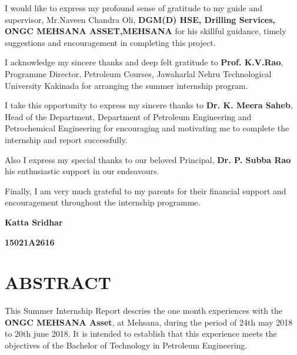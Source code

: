 \documentclass[113pt,a4paper]{report}
\begin{document}
I would like to express my profound sense of gratitude to my guide and supervisor, Mr.Naveen Chandra Oli, \textbf{DGM(D) HSE, Drilling Services, ONGC MEHSANA ASSET,MEHSANA} for his skillful guidance, timely suggestions and encouragement in completing this project.

\vspace{1em}


I acknowledge my sincere thanks and deep felt gratitude to \textbf{Prof. K.V.Rao}, Programme Director, Petroleum Courses, Jawaharlal Nehru Technological University Kakinada for arranging the summer internship program.

\vspace{1em}

I take this opportunity to express my sincere thanks to \textbf{Dr. K. Meera Saheb}, Head of the Department, Department of Petroleum Engineering and Petrochemical Engineering for encouraging and motivating me to complete the internship and report successfully.

\vspace{1em}

Also I express my special thanks to our beloved Principal, \textbf{Dr. P. Subba Rao} his enthusiastic support in our endeavours.

\vspace{1em}

Finally, I am very much grateful to my parents for their financial support and encouragement throughout the internship programme.

\vspace{1em}

\hfill \textbf{Katta Sridhar}

\hfill \textbf{15021A2616} \hspace{0.005\textwidth}

\newpage

\tableofcontents


\newpage

\section*{\centering ABSTRACT}


This  Summer Internship Report  descries the one month experiences with the \textbf{ONGC MEHSANA Asset}, at Mehsana,
during the period of 24th may 2018 to 20th june 2018. It is  intended to  establish that this  experience 
meets  the  objectives  of the Bachelor of Technology in Petroleum Engineering.
\end{document}
